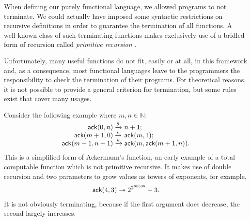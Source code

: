 \label{par:ackermann}
When defining our purely functional language, we allowed programs to
not terminate. We could actually have imposed some syntactic
restrictions on recursive definitions in order to guarantee the
termination of all functions. A well\hyp{}known class of such
terminating functions makes exclusively use of a bridled form of
recursion called \emph{primitive recursion}
\citep{Robinson_1947,Robinson_1948}.

Unfortunately, many useful functions do not fit, easily or at all, in
this framework and, as a consequence, most functional languages leave
to the programmers the responsibility to check the termination of
their programs. For theoretical reasons, it is not possible to provide
a general criterion for termination, but some rules exist that cover
many usages.

Consider the following example where \(m,n \in \mathbb{N}\):
\begin{equation*}
\begin{array}{@{}r@{\;}l@{\;}l@{}}
\fun{ack}(0,n)     & \smashedrightarrow{\theta} & n+1;\\
\fun{ack}(m+1,0)   & \smashedrightarrow{\iota} & \fun{ack}(m,1);\\
\fun{ack}(m+1,n+1) & \smashedrightarrow{\kappa}
                   & \fun{ack}(m,\fun{ack}(m+1,n)).
\end{array}
\end{equation*}
This is a simplified form of Ackermann's
function, an early example of a total
computable function which is not primitive recursive. It makes use of
double recursion and two parameters to grow values as towers of
exponents, for example,
\begin{equation*}
  \textsf{ack}(4,3) \twoheadrightarrow 2^{2^{65536}} - 3.
\end{equation*}
It is not obviously terminating, because if the first argument does
decrease, the second largely increases.

